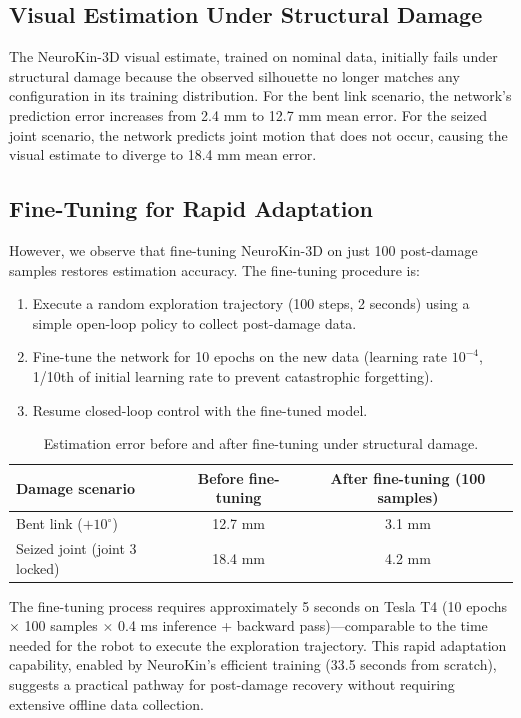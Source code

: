 \documentclass[12pt,a4paper,oneside]{report}
\begin{document}
\subsection{Visual Estimation Under Structural Damage}

The NeuroKin-3D visual estimate, trained on nominal data, initially fails under structural damage because the observed silhouette no longer matches any configuration in its training distribution. For the bent link scenario, the network's prediction error increases from 2.4 mm to 12.7 mm mean error. For the seized joint scenario, the network predicts joint motion that does not occur, causing the visual estimate to diverge to 18.4 mm mean error.

\subsection{Fine-Tuning for Rapid Adaptation}

However, we observe that fine-tuning NeuroKin-3D on just 100 post-damage samples restores estimation accuracy. The fine-tuning procedure is:
\begin{enumerate}
    \item Execute a random exploration trajectory (100 steps, 2 seconds) using a simple open-loop policy to collect post-damage data.
    \item Fine-tune the network for 10 epochs on the new data (learning rate $10^{-4}$, 1/10th of initial learning rate to prevent catastrophic forgetting).
    \item Resume closed-loop control with the fine-tuned model.
\end{enumerate}

\begin{table}[H]
\centering
\caption{Estimation error before and after fine-tuning under structural damage.}
\label{tab:fine_tuning}
\begin{tabular}{lcc}
\toprule
Damage scenario & Before fine-tuning & After fine-tuning (100 samples) \\
\midrule
Bent link ($+10^\circ$) & 12.7 mm & 3.1 mm \\
Seized joint (joint 3 locked) & 18.4 mm & 4.2 mm \\
\bottomrule
\end{tabular}
\end{table}

The fine-tuning process requires approximately 5 seconds on Tesla T4 (10 epochs $\times$ 100 samples $\times$ 0.4 ms inference + backward pass)---comparable to the time needed for the robot to execute the exploration trajectory. This rapid adaptation capability, enabled by NeuroKin's efficient training (33.5 seconds from scratch), suggests a practical pathway for post-damage recovery without requiring extensive offline data collection.
\end{document}
